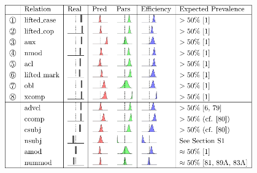\documentclass[10pt,twoside,lineno]{article}
\begin{document}
\begin{table} %
	\begin{center}	
\includegraphics[width=0.8\textwidth]{si-table-perrel-1a-1.png}
\end{center}
\caption{Predictions on UD relations with predictions from the typological literature.
The first section contains the eight correlations discussed in the main paper (See Section~\ref{sec:correlations}); the second section provides other relations for which predictions are available.
In the last column, we indicate what direction would be expected typologically. 
}
\label{tab:all-predictions-1}
\end{table}
\end{document}
